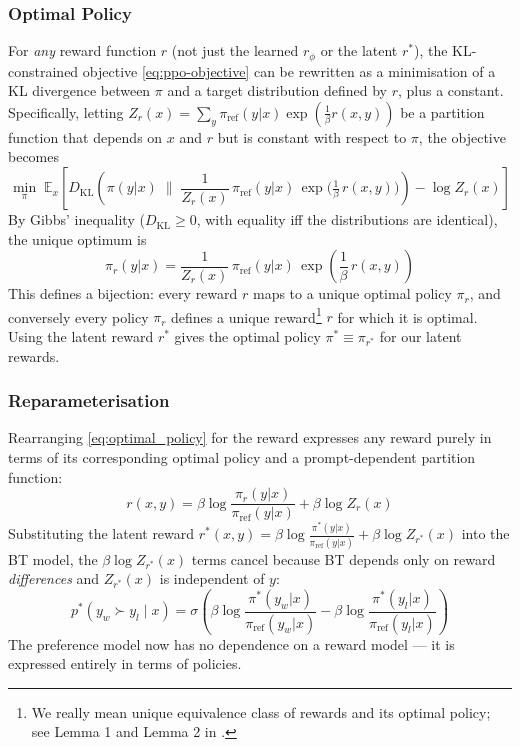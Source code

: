 \documentclass[11pt]{article}
\begin{document}
\subsubsection{Optimal Policy}
For \textit{any} reward function $r$ (not just the learned $r_\phi$ or the latent $r^*$), the KL-constrained objective \eqref{eq:ppo-objective} can be rewritten as a minimisation of a KL divergence between $\pi$ and a target distribution defined by $r$, plus a constant. Specifically, letting $Z_r(x) = \sum_y \pi_{\text{ref}}(y|x)\exp\!\left(\frac{1}{\beta}r(x,y)\right)$ be a partition function that depends on $x$ and $r$ but is constant with respect to $\pi$, the objective becomes
$$
    \min_{\pi} \; \mathbb{E}_{x} \left[ D_{\text{KL}}\!\left(\pi(y|x) \;\Big\|\; \frac{1}{Z_r(x)}\,\pi_{\text{ref}}(y|x)\,\exp\!\Big(\tfrac{1}{\beta}\,r(x,y)\Big)\right) - \log Z_r(x) \right]
$$
By Gibbs' inequality ($D_{\text{KL}} \geq 0$, with equality iff the distributions are identical), the unique optimum is
\begin{equation}
    \pi_r(y|x) = \frac{1}{Z_r(x)}\,\pi_{\text{ref}}(y|x)\,\exp\!\left(\frac{1}{\beta}\,r(x,y)\right)
    \label{eq:optimal_policy}
\end{equation}
This defines a bijection: every reward $r$ maps to a unique optimal policy $\pi_r$, and conversely every policy $\pi_r$ defines a unique reward\footnote{We really mean unique equivalence class of rewards and its optimal policy; see Lemma 1 and Lemma 2 in \autocite{rafailov2024directpreferenceoptimizationlanguage}.} $r$ for which it is optimal. Using the latent reward $r^*$ gives the optimal policy $\pi^* \equiv \pi_{r^*}$ for our latent rewards.

\subsubsection{Reparameterisation}
Rearranging \eqref{eq:optimal_policy} for the reward expresses any reward purely in terms of its corresponding optimal policy and a prompt-dependent partition function:
$$
    r(x, y) = \beta \log\frac{\pi_r(y|x)}{\pi_{\text{ref}}(y|x)} + \beta \log Z_r(x)
$$
Substituting the latent reward $r^*(x,y) = \beta \log\frac{\pi^*(y|x)}{\pi_{\text{ref}}(y|x)} + \beta \log Z_{r^*}(x)$ into the BT model, the $\beta \log Z_{r^*}(x)$ terms cancel because BT depends only on reward \textit{differences} and $Z_{r^*}(x)$ is independent of $y$:
$$
    p^*(y_w \succ y_l \mid x) = \sigma\!\left(\beta \log \frac{\pi^*(y_w|x)}{\pi_{\text{ref}}(y_w|x)} - \beta \log \frac{\pi^*(y_l|x)}{\pi_{\text{ref}}(y_l|x)}\right)
$$
The preference model now has no dependence on a reward model --- it is expressed entirely in terms of policies.
\end{document}
